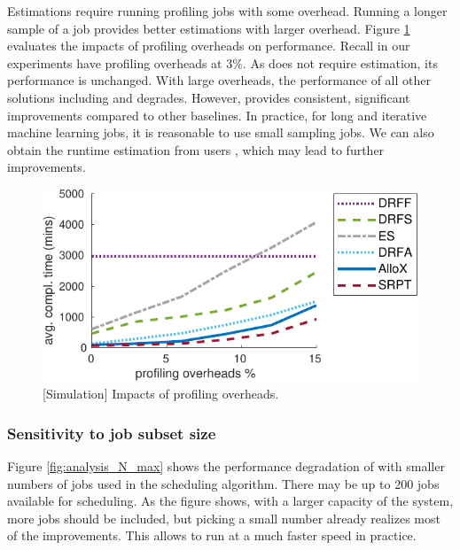 Estimations require running profiling jobs with some overhead. Running a longer sample of a job provides better estimations with larger overhead. 
Figure \ref{fig:analysis_overhead} evaluates the impacts of profiling overheads on performance. Recall in our experiments have profiling overheads at 3\%.
As \DRFFIFO does not require estimation, its performance is unchanged.%
With large overheads, the performance of all other solutions including \name and \SRPT degrades. 
However, \name provides consistent, significant improvements compared to other baselines. 
In practice, for long and iterative machine learning jobs, it is reasonable to use small sampling jobs. 
We can also obtain the runtime estimation from users \cite{tetrisched, choosy}, which may lead to further improvements.

\begin{figure}[h]
	\centering	
	\includegraphics[width=0.9\linewidth]{figs/analysis_overhead_ext}
	\caption{[Simulation] Impacts of profiling overheads.}%
	\label{fig:analysis_overhead}
\end{figure}

\subsubsection{Sensitivity to \name job subset size}
\label{sec:N_max}

Figure \ref{fig:analysis_N_max} shows the performance degradation of \name with smaller numbers of jobs used in the scheduling algorithm. There may be up to 200 jobs available for scheduling. As the figure shows, with a larger capacity of the system, more jobs should be included, but picking a small number already realizes most of the improvements. This allows \name to run at a much faster speed in practice. 

